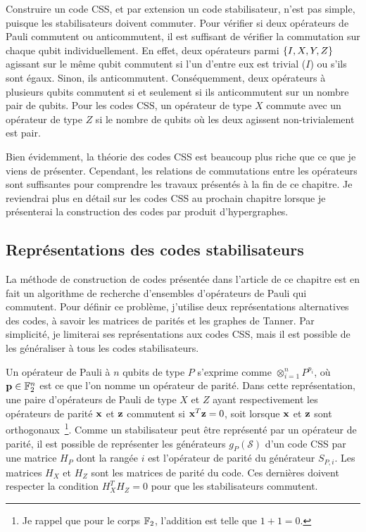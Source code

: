 Construire un code CSS, et par extension un code stabilisateur, n'est pas simple,
puisque les stabilisateurs doivent commuter.
Pour vérifier si deux opérateurs de Pauli commutent ou anticommutent,
il est suffisant de vérifier la commutation sur chaque qubit individuellement.
En effet,
deux opérateurs parmi $\qty{I, X, Y, Z}$ agissant sur le même qubit commutent si l'un d'entre 
eux est trivial ($I$) ou s'ils sont égaux.
Sinon, ils anticommutent.
Conséquemment,
deux opérateurs à plusieurs qubits commutent si et seulement si ils anticommutent sur un nombre 
pair de qubits.
Pour les codes CSS, 
un opérateur de type $X$ commute avec un opérateur de type $Z$ si le nombre de qubits où les deux
agissent non-trivialement est pair.

Bien évidemment,
la théorie des codes CSS est beaucoup plus riche que ce que je viens de présenter.
Cependant,
les relations de commutations entre les opérateurs sont suffisantes pour comprendre
les travaux présentés à la fin de ce chapitre.
Je reviendrai plus en détail sur les codes CSS au prochain chapitre lorsque je présenterai
la construction des codes par produit d'hypergraphes.
 
\subsection{Représentations des codes stabilisateurs}
\label{sec:representations_codes}

La méthode de construction de codes présentée dans l'article de ce chapitre est en fait un algorithme
de recherche d'ensembles d'opérateurs de Pauli qui commutent.
Pour définir ce problème,
j'utilise deux représentations alternatives des codes, à savoir les matrices de parités et les graphes de Tanner.
Par simplicité,
je limiterai ses représentations aux codes CSS,
mais il est possible de les généraliser à tous les codes stabilisateurs.

Un opérateur de Pauli à $n$ qubits de type $P$ s'exprime comme $\otimes_{i=1}^{n} P^{p_i}$,
où $\vb p \in \mathbb{F}_{2}^{n}$ est ce que l'on nomme un opérateur de parité.
Dans cette représentation,
une paire d'opérateurs de Pauli de type $X$ et $Z$ ayant respectivement les opérateurs de parité $\vb x$ 
et $\vb z$ commutent si $\vb x^T \vb z = 0$,
soit lorsque $\vb x$ et $\vb z$ sont orthogonaux~\footnote{Je rappel que pour le corps $\mathbb{F}_{2}$, 
l'addition est telle que $1 + 1 = 0$.}.
Comme un stabilisateur peut être représenté par un opérateur de parité,
il est possible de représenter les générateurs $g_P(\mathcal S)$ d'un code CSS
par une matrice $H_P$ dont la rangée $i$ est l'opérateur de parité du
générateur $S_{P, i}$.
Les matrices $H_X$ et $H_Z$ sont les matrices de parité du code.
Ces dernières doivent respecter la condition $H_X^T H_Z = 0$ pour 
que les stabilisateurs commutent.

